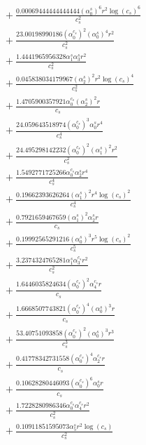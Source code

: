 \documentclass[10pt]{article}
\begin{document}
\begin{align*}
&{}  + \frac{0.00069444444444444 \left(\alpha_{0}^s\right)^{6} r^{2} \log{\left(c_{s} \right)}^{6}}{c_{s}^{2}} \\
&{}  + \frac{23.00198990186 \left(\alpha_{0}^{c_s}\right)^{2} \left(\alpha_{0}^s\right)^{4} r^{2}}{c_{s}^{2}} \\
&{}  + \frac{1.4441965956328 \alpha_{1}^s \alpha_{3}^s r^{2}}{c_{s}^{2}} \\
&{}  + \frac{0.045838034179967 \left(\alpha_{2}^s\right)^{2} r^{2} \log{\left(c_{s} \right)}^{4}}{c_{s}^{2}} \\
&{}  + \frac{1.4705900357921 \alpha_{0}^{c_s} \left(\alpha_{2}^s\right)^{2} r}{c_{s}} \\
&{}  + \frac{24.059643518974 \left(\alpha_{0}^{c_s}\right)^{3} \alpha_{0}^s r^{4}}{c_{s}^{4}} \\
&{}  + \frac{24.495298142232 \left(\alpha_{0}^{c_s}\right)^{2} \left(\alpha_{1}^s\right)^{2} r^{2}}{c_{s}^{2}} \\
&{}  + \frac{1.5492771725266 \alpha_{0}^{c_s} \alpha_{2}^s r^{4}}{c_{s}^{4}} \\
&{}  + \frac{0.19662393626264 \left(\alpha_{1}^s\right)^{2} r^{4} \log{\left(c_{s} \right)}^{2}}{c_{s}^{4}} \\
&{}  + \frac{0.7921659467659 \left(\alpha_{1}^s\right)^{2} \alpha_{2}^s r}{c_{s}} \\
&{}  + \frac{0.19992565291216 \left(\alpha_{0}^s\right)^{3} r^{5} \log{\left(c_{s} \right)}^{2}}{c_{s}^{5}} \\
&{}  + \frac{3.2374324765281 \alpha_{1}^s \alpha_{3}^{c_s} r^{2}}{c_{s}^{2}} \\
&{}  + \frac{1.6446035824634 \left(\alpha_{0}^{c_s}\right)^{2} \alpha_{4}^{c_s} r}{c_{s}} \\
&{}  + \frac{1.6668507743821 \left(\alpha_{0}^{c_s}\right)^{4} \left(\alpha_{0}^s\right)^{3} r}{c_{s}} \\
&{}  + \frac{53.40751093858 \left(\alpha_{0}^{c_s}\right)^{2} \left(\alpha_{0}^s\right)^{3} r^{3}}{c_{s}^{3}} \\
&{}  + \frac{0.41778342731558 \left(\alpha_{0}^{c_s}\right)^{4} \alpha_{2}^{c_s} r}{c_{s}} \\
&{}  + \frac{0.10628280446093 \left(\alpha_{0}^{c_s}\right)^{6} \alpha_{0}^s r}{c_{s}} \\
&{}  + \frac{1.7228280986346 \alpha_{0}^{c_s} \alpha_{4}^{c_s} r^{2}}{c_{s}^{2}} \\
&{}  + \frac{0.10911851595073 \alpha_{5}^s r^{2} \log{\left(c_{s} \right)}}{c_{s}^{2}} \\

\end{align*}
\end{document}
